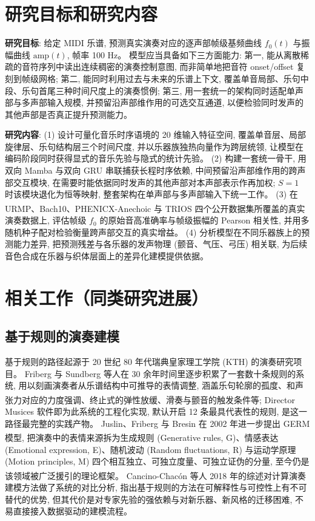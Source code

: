 \documentclass[a4paper, UTF8, zihao=-4, fontset=fandol]{ctexart}
\newcommand{\upcite}[1]{\textsuperscript{\cite{#1}}}
\begin{document}
\section{研究目标和研究内容}

\textbf{研究目标}: 给定 MIDI 乐谱, 预测真实演奏对应的逐声部帧级基频曲线 $f_0(t)$ 与振幅曲线 $\mathrm{amp}(t)$, 帧率 100 Hz。 模型应当具备如下三方面能力: 第一, 能从离散稀疏的音符序列中读出连续稠密的演奏控制意图, 而非简单地把音符 onset/offset 复刻到帧级网格; 第二, 能同时利用过去与未来的乐谱上下文, 覆盖单音局部、乐句中段、乐句首尾三种时间尺度上的演奏惯例; 第三, 用一套统一的架构同时适配单声部与多声部输入规模, 并预留沿声部维作用的可选交互通道, 以便检验同时发声的其他声部是否真正提升预测能力。

\textbf{研究内容}: (1) 设计可量化音乐时序语境的 20 维输入特征空间, 覆盖单音层、局部旋律层、乐句结构层三个时间尺度, 并以乐器族独热向量作为跨层统领, 让模型在编码阶段同时获得显式的音乐先验与隐式的统计先验。 (2) 构建一套统一骨干, 用双向 Mamba 与双向 GRU 串联捕获长程时序依赖, 中间预留沿声部维作用的跨声部交互模块, 在需要时能依据同时发声的其他声部对本声部表示作再加权; $S = 1$ 时该模块退化为恒等映射, 整套架构在单声部与多声部输入下统一工作。 (3) 在 URMP\upcite{urmp}、Bach10\upcite{bach10}、PHENICX-Anechoic 与 TRIOS 四个公开数据集所覆盖的真实演奏数据上, 评估帧级 $f_0$ 的原始音高准确率与帧级振幅的 Pearson 相关性, 并用多随机种子配对检验衡量跨声部交互的真实增益。 (4) 分析模型在不同乐器族上的预测能力差异, 把预测残差与各乐器的发声物理 (颤音、气压、弓压) 相关联, 为后续音色合成在乐器与织体层面上的差异化建模提供依据。

\section{相关工作（同类研究进展）}

\subsection{基于规则的演奏建模}

基于规则的路径起源于 20 世纪 80 年代瑞典皇家理工学院 (KTH) 的演奏研究项目。 Friberg 与 Sundberg 等人在 30 余年时间里逐步积累了一套数十条规则的系统, 用以刻画演奏者从乐谱结构中可推导的表情调整, 涵盖乐句轮廓的孤度、和声张力对应的力度强调、终止式的弹性放缓、滑奏与颤音的触发条件等\upcite{kth}; Director Musices 软件即为此系统的工程化实现, 默认开启 12 条最具代表性的规则, 是这一路径最完整的实践产物。 Juslin、Friberg 与 Bresin 在 2002 年进一步提出 GERM 模型\upcite{germ}, 把演奏中的表情来源拆为生成规则 (Generative rules, G)、情感表达 (Emotional expression, E)、随机波动 (Random fluctuations, R) 与运动学原理 (Motion principles, M) 四个相互独立、可独立度量、可独立证伪的分量, 至今仍是该领域被广泛援引的理论框架。 Cancino-Chacón 等人 2018 年的综述\upcite{cancino}对计算演奏建模方法做了系统的对比分析, 指出基于规则的方法在可解释性与可控性上有不可替代的优势, 但其代价是对专家先验的强依赖与对新乐器、新风格的迁移困难, 不易直接接入数据驱动的建模流程。
\end{document}
